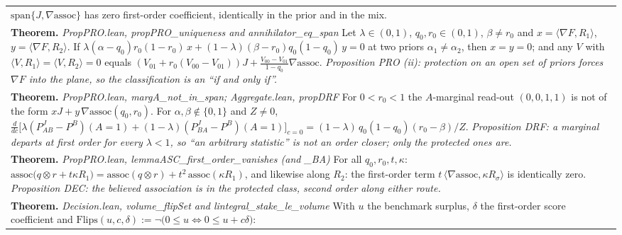 \documentclass[10pt]{article}
\theoremstyle{definition}
\newlength{\fullw}\setlength{\fullw}{25.9cm}
\begin{document}
{\begin{longtable}{|p{0.9cm}|p{12.2cm}|p{12.2cm}|}
{{$\mathrm{span}\{J,\nabla\mathrm{assoc}\}$ has zero first-order coefficient,
identically in the prior and in the mix.}} \\
\multicolumn{3}{|p{\fullw}|}{\textbf{Theorem.} \textit{PropPRO.lean, propPRO\_uniqueness and annihilator\_eq\_span} \newline Let $\lambda\in(0,1)$, $q_0,r_0\in(0,1)$, $\beta\neq r_0$ and
$x = \langle\nabla F,R_1\rangle$, $y = \langle\nabla F,R_2\rangle$. If
$\lambda(\alpha-q_0)r_0(1-r_0)\,x + (1-\lambda)(\beta-r_0)q_0(1-q_0)\,y = 0$ at two
priors $\alpha_1\neq\alpha_2$, then $x = y = 0$; and any $V$ with
$\langle V,R_1\rangle = \langle V,R_2\rangle = 0$ equals
$(V_{01} + r_0(V_{00}-V_{01}))J + \frac{V_{00}-V_{01}}{1-q_0}\nabla\mathrm{assoc}$. \newline \textit{Proposition PRO (ii): protection on an open set of priors forces
$\nabla F$ into the plane, so the classification is an ``if and only if''.}} \\
\multicolumn{3}{|p{\fullw}|}{\textbf{Theorem.} \textit{PropPRO.lean, margA\_not\_in\_span; Aggregate.lean, propDRF} \newline For $0<r_0<1$ the $A$-marginal read-out $(0,0,1,1)$ is not of the
form $xJ + y\,\nabla\mathrm{assoc}(q_0,r_0)$. For $\alpha,\beta\notin\{0,1\}$ and
$Z\neq0$,
$\frac{d}{dc}\big[\lambda(P^J_{AB}-P^B)(A{=}1) + (1-\lambda)(P^J_{BA}-P^B)(A{=}1)\big]_{c=0}
= (1-\lambda)\,q_0(1-q_0)(r_0-\beta)/Z$. \newline \textit{Proposition DRF: a marginal departs at first order for every
$\lambda<1$, so ``an arbitrary statistic'' is not an order closer; only the
protected ones are.}} \\
\multicolumn{3}{|p{\fullw}|}{\textbf{Theorem.} \textit{PropPRO.lean, lemmaASC\_first\_order\_vanishes (and \_BA)} \newline For all $q_0,r_0,t,\kappa$:
$\mathrm{assoc}\big(q\otimes r + t\kappa R_1\big) = \mathrm{assoc}(q\otimes r)
+ t^2\,\mathrm{assoc}(\kappa R_1)$, and likewise along $R_2$: the first-order
term $t\,\langle\nabla\mathrm{assoc},\kappa R_\sigma\rangle$ is identically zero. \newline \textit{Proposition DEC: the believed association is in the protected
class, second order along either route.}} \\
\multicolumn{3}{|p{\fullw}|}{\textbf{Theorem.} \textit{Decision.lean, volume\_flipSet and lintegral\_stake\_le\_volume} \newline With $u$ the benchmark surplus, $\delta$ the first-order score
coefficient and $\mathrm{Flips}(u,c,\delta) := \neg\big(0\le u \iff 0\le u + c\delta\big)$:
}
\end{longtable}}
\end{document}
